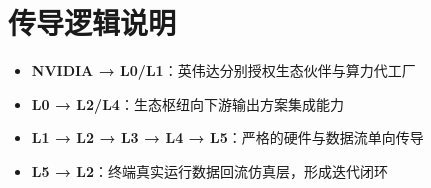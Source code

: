 \section{传导逻辑说明}

\begin{itemize}[leftmargin=2em]
  \item \textbf{NVIDIA → L0/L1}：英伟达分别授权生态伙伴与算力代工厂
  \item \textbf{L0 → L2/L4}：生态枢纽向下游输出方案集成能力
  \item \textbf{L1 → L2 → L3 → L4 → L5}：严格的硬件与数据流单向传导
  \item \textbf{L5 → L2}：终端真实运行数据回流仿真层，形成迭代闭环
\end{itemize}
